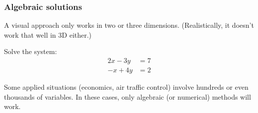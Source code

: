 \documentclass{beamer}
\begin{document}
\begin{frame}\frametitle{Algebraic solutions}
 A visual approach only works in two or three dimensions. (Realistically, it doesn't work that well in 3D either.)\\
\begin{example}
 Solve the system:
\begin{align*}
 2x-3y& = 7\\
 -x+4y& = 2
\end{align*}

\end{example}

\bigskip

 Some applied situations (economics, air traffic control) involve hundreds or even thousands of variables. In these cases, only algebraic (or numerical) methods will work.
\end{frame}
\end{document}
